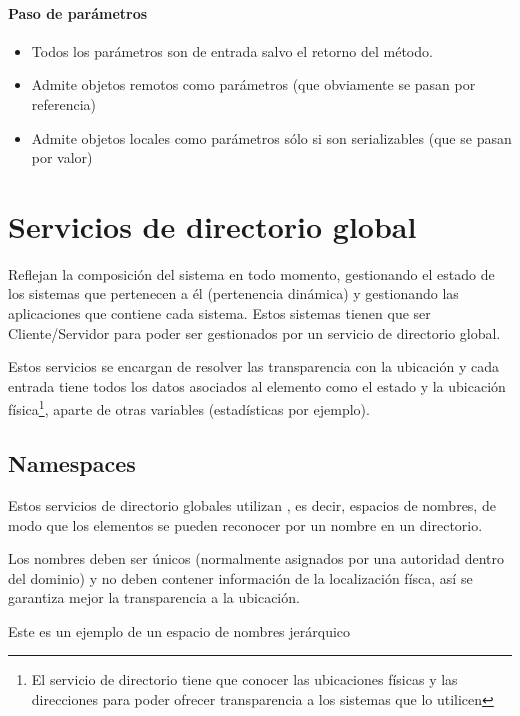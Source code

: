 \paragraph{Paso de parámetros}
\begin{itemize}
	\item Todos los parámetros son de entrada salvo el retorno del método.
	\item Admite objetos remotos como parámetros (que obviamente se pasan por referencia)
	\item Admite objetos locales como parámetros sólo si son serializables (que se pasan por valor)
\end{itemize}

\section{Servicios de directorio global}

Reflejan la composición del sistema en todo momento, gestionando el estado de los sistemas que pertenecen a él (pertenencia dinámica) y gestionando las aplicaciones que contiene cada sistema. Estos sistemas tienen que ser Cliente/Servidor para poder ser gestionados por un servicio de directorio global.

Estos servicios se encargan de resolver las transparencia con la ubicación y cada entrada tiene todos los datos asociados al elemento como el estado y la ubicación física\footnote{El servicio de directorio tiene que conocer las ubicaciones físicas y las direcciones para poder ofrecer transparencia a los sistemas que lo utilicen}, aparte de otras variables (estadísticas por ejemplo).


\subsection{Namespaces}
Estos servicios de directorio globales utilizan , es decir, espacios de nombres, de modo que los elementos se pueden reconocer por un nombre en un directorio.

Los nombres deben ser únicos (normalmente asignados por una autoridad dentro del dominio) y no deben contener información de la localización físca, así se garantiza mejor la transparencia a la ubicación.

Este es un ejemplo de un espacio de nombres jerárquico


